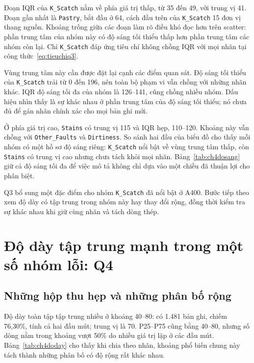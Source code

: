 \documentclass[12pt,a4paper,oneside]{report}
\newcommand{\maCot}[1]{{\urlstyle{tt}\def\UrlBreaks{\do\_\do\/\do\.}\def\UrlBigBreaks{}\nolinkurl{#1}}}
\begin{document}
Đoạn IQR của \maCot{K_Scatch} nằm về phía giá trị thấp, từ 35 đến 49, với trung vị 41. Đoạn gần nhất là \maCot{Pastry}, bắt đầu ở 64, cách đầu trên của \maCot{K_Scatch} 15 đơn vị thang nguồn. Khoảng trống giữa các đoạn làm rõ điều khó đọc hơn trên scatter: phần trung tâm của nhóm này có độ sáng tối thiểu thấp hơn phần trung tâm các nhóm còn lại. Chỉ \maCot{K_Scatch} đáp ứng tiêu chí không chồng IQR với mọi nhãn tại công thức~\ref{eq:tieuchiq3}.

Vùng trung tâm này cần được đặt lại cạnh các điểm quan sát. Độ sáng tối thiểu của \maCot{K_Scatch} trải từ 0 đến 196, nên toàn bộ phạm vi vẫn chồng với những nhãn khác. IQR độ sáng tối đa của nhóm là 126--141, cũng chồng nhiều nhóm. Dấu hiệu nhìn thấy là sự khác nhau ở phần trung tâm của độ sáng tối thiểu; nó chưa đủ để gán nhãn chính xác cho mọi bản ghi mới.

Ở phía giá trị cao, \maCot{Stains} có trung vị 115 và IQR hẹp, 110--120. Khoảng này vẫn chồng với \maCot{Other_Faults} và \maCot{Dirtiness}. So sánh hai đầu của biểu đồ cho thấy mỗi nhóm có một hồ sơ độ sáng riêng: \maCot{K_Scatch} nổi bật về vùng trung tâm thấp, còn \maCot{Stains} có trung vị cao nhưng chưa tách khỏi mọi nhãn. Bảng~\ref{tab:ch4dosang} giữ cả độ sáng tối đa để việc mô tả không chỉ dựa vào một chiều đã thuận lợi cho phân biệt.

Q3 bổ sung một đặc điểm cho nhóm \maCot{K_Scatch} đã nổi bật ở A400. Bước tiếp theo xem độ dày có tập trung trong nhóm này hay thay đổi rộng, đồng thời kiểm tra sự khác nhau khi giữ cùng nhãn và tách dòng thép.

\section{Độ dày tập trung mạnh trong một số nhóm lỗi: Q4}
\label{sec:ch4q4}

\subsection{Những hộp thu hẹp và những phân bố rộng}

Độ dày toàn tập tập trung nhiều ở khoảng 40--80: có 1.481 bản ghi, chiếm 76,30\%, tính cả hai đầu mút; trung vị là 70. P25--P75 cũng bằng 40--80, nhưng số dòng nằm trong khoảng vượt 50\% do nhiều giá trị lặp ở các đầu mút. Bảng~\ref{tab:ch4doday} cho thấy khi chia theo nhãn, khoảng phổ biến chung này tách thành những phân bố có độ rộng rất khác nhau.
\end{document}
